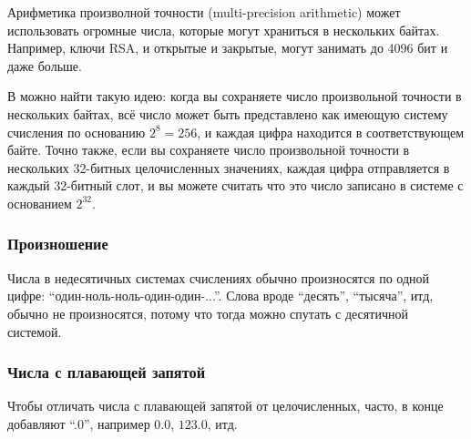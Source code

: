 Арифметика произволной точности (multi-precision arithmetic) может использовать огромные числа,
которые могут храниться в нескольких байтах.
Например, ключи RSA, и открытые и закрытые, могут занимать до 4096 бит и даже больше.

В  можно найти такую идею: когда вы сохраняете число произвольной точности в нескольких байтах,
всё число может быть представлено как имеющую систему счисления по основанию $2^8=256$, и каждая цифра находится
в соответствующем байте.
Точно также, если вы сохраняете число произвольной точности в нескольких 32-битных целочисленных значениях,
каждая цифра отправляется в каждый 32-битный слот, и вы можете считать что это число записано в системе с основанием $2^{32}$.

\subsubsection{Произношение}

Числа в недесятичных системах счислениях обычно произносятся по одной цифре: ``один-ноль-ноль-один-один-...''.
Слова вроде ``десять'', ``тысяча'', итд, обычно не произносятся, потому что тогда можно спутать с десятичной системой.

\subsubsection{Числа с плавающей запятой}

Чтобы отличать числа с плавающей запятой от целочисленных, часто, в конце добавляют ``.0'',
например $0.0$, $123.0$, итд.


